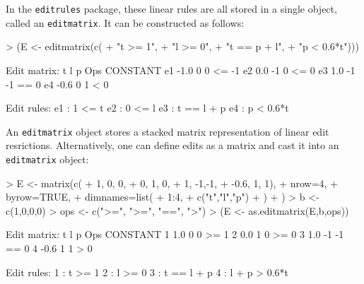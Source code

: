 \documentclass[11pt, fleqn, a4paper]{article}
\begin{document}
In the {\tt editrules} package, these linear rules are all stored in a single object, called an
{\tt editmatrix}. It can be constructed as follows:
\begin{Schunk}
\begin{Sinput}
> (E <- editmatrix(c(
+     "t >= 1", 
+     "l >= 0",
+     "t == p + l",
+     "p < 0.6*t")))
\end{Sinput}
\begin{Soutput}
Edit matrix:
      t  l  p Ops CONSTANT
e1 -1.0  0  0  <=       -1
e2  0.0 -1  0  <=        0
e3  1.0 -1 -1  ==        0
e4 -0.6  0  1   <        0

Edit rules:
e1 : 1 <= t 
e2 : 0 <= l 
e3 : t == l + p 
e4 : p < 0.6*t  
\end{Soutput}
\end{Schunk}
An {\tt editmatrix} object stores a stacked matrix representation of linear
edit resrictions. Alternatively, one can define edits as a matrix and
cast it into an {\tt editmatrix} object:
\begin{Schunk}
\begin{Sinput}
> E <- matrix(c(
+      1,   0, 0,
+      0,   1, 0,
+      1,  -1,-1,
+     -0.6, 1, 1),
+     nrow=4,
+     byrow=TRUE,
+     dimnames=list(
+         1:4,
+         c("t","l","p")
+     )
+ )
> b <- c(1,0,0,0)
> ops <- c(">=", ">=", "==", ">")
> (E <- as.editmatrix(E,b,ops))
\end{Sinput}
\begin{Soutput}
Edit matrix:
     t  l  p Ops CONSTANT
1  1.0  0  0  >=        1
2  0.0  1  0  >=        0
3  1.0 -1 -1  ==        0
4 -0.6  1  1   >        0

Edit rules:
1 : t >= 1 
2 : l >= 0 
3 : t == l + p 
4 : l + p > 0.6*t  
\end{Soutput}
\end{Schunk}
\end{document}
